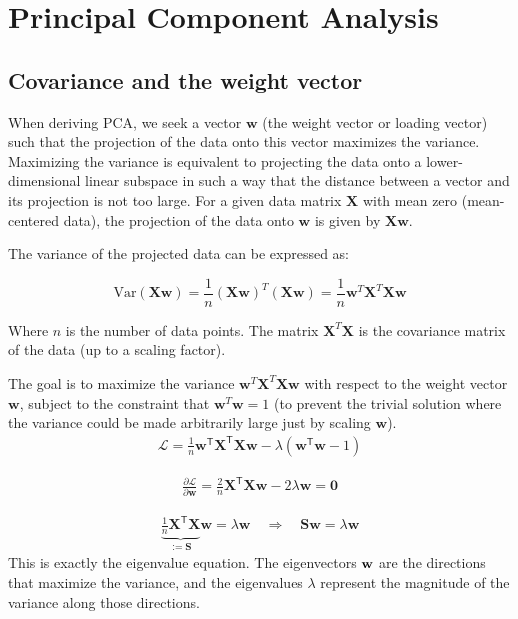 \section{Principal Component Analysis}
\subsection{Covariance and the weight vector}

When deriving PCA, we seek a vector \( \mathbf{w} \) (the weight vector or loading vector) such that the projection of the data onto this vector maximizes the variance. Maximizing the variance is equivalent to projecting the data onto a lower-dimensional linear subspace in such a way that the distance between a vector and its projection is not too large. For a given data matrix \( \mathbf{X} \) with mean zero (mean-centered data), the projection of the data onto \( \mathbf{w} \) is given by \( \mathbf{X}\mathbf{w} \).

The variance of the projected data can be expressed as:

\[
\text{Var}(\mathbf{X}\mathbf{w}) = \frac{1}{n} (\mathbf{X}\mathbf{w})^T (\mathbf{X}\mathbf{w}) = \frac{1}{n} \mathbf{w}^T \mathbf{X}^T \mathbf{X} \mathbf{w}
\]

Where \( n \) is the number of data points. The matrix \( \mathbf{X}^T \mathbf{X} \) is the covariance matrix of the data (up to a scaling factor).

The goal is to maximize the variance \( \mathbf{w}^T \mathbf{X}^T \mathbf{X} \mathbf{w} \) with respect to the weight vector \( \mathbf{w} \), subject to the constraint that \( \mathbf{w}^T \mathbf{w} = 1 \) (to prevent the trivial solution where the variance could be made arbitrarily large just by scaling \( \mathbf{w} \)).
\begin{align*}
	\mathcal{L} = \frac{1}{n} \mathbf{w}^\mathsf{T} \mathbf{X}^\mathsf{T} \mathbf{X} \mathbf{w} - \lambda \left( \mathbf{w}^\mathsf{T} \mathbf{w}  - 1 \right)
\end{align*}

\begin{align*}
	\frac{\partial \mathcal{L}}{\partial \mathbf{w}} = \frac{2}{n} \mathbf{X}^\mathsf{T} \mathbf{X} \mathbf{w} - 2 \lambda \mathbf{w} = \mathbf{0}
\end{align*}

\begin{align*}
	\underbrace{ \frac{1}{n} \mathbf{X}^\mathsf{T} \mathbf{X} }_{:= \mathbf{S} } \mathbf{w} = \lambda \mathbf{w}  \quad \Rightarrow \quad \mathbf{S} \mathbf{w} = \lambda \mathbf{w}
\end{align*}
This is exactly the eigenvalue equation. The eigenvectors ${\mathbf{w}}$ are the directions that maximize the variance, and the eigenvalues $\lambda$ represent the magnitude of the variance along those directions.

